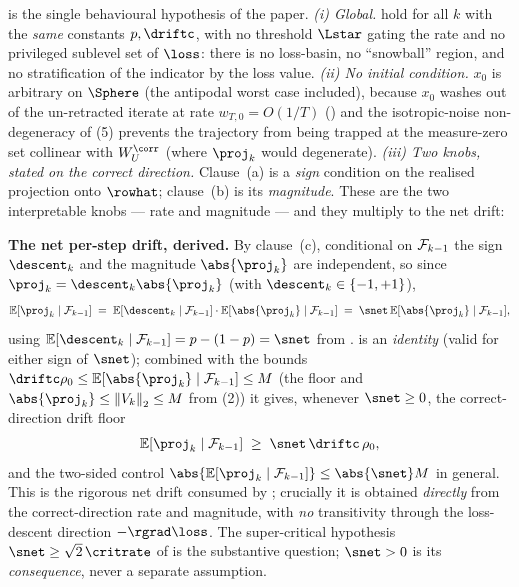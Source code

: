 \begin{remark}
\label{rem:descent_globality}
 is the single behavioural hypothesis of the paper.
\emph{(i) Global.} 
hold for all $k$ with the \emph{same} constants $p,\driftc$, with no
threshold $\Lstar$ gating the rate and no privileged sublevel set of
$\loss$: there is no loss-basin, no ``snowball'' region, and no
stratification of the indicator by the loss value. \emph{(ii) No initial
condition.} $x_0$ is arbitrary on $\Sphere$ (the antipodal worst case
included), because $x_0$ washes out of the un-retracted iterate at rate
$w_{T,0}=O(1/T)$ () and the
isotropic-noise non-degeneracy of (5)
prevents the trajectory from being trapped at the measure-zero set
collinear with $W_U^{\corr}$ (where $\proj_k$ would degenerate). \emph{(iii)
Two knobs, stated on the correct direction.} Clause~(a) is a \emph{sign}
condition on the realised projection onto $\rowhat$; clause~(b) is its
\emph{magnitude}. These are the two interpretable knobs --- rate and
magnitude --- and they multiply to the net drift:

\smallskip\noindent\textbf{The net per-step drift, derived.} By
clause~(c), conditional on $\mathcal{F}_{k-1}$ the sign $\descent_k$ and the
magnitude $\abs{\proj_k}$ are independent, so since
$\proj_k=\descent_k\abs{\proj_k}$ (with $\descent_k\in\{-1,+1\}$),
\begin{align}\label{eq:net_drift}
   \E[\proj_k\mid\Fcal_{k-1}]
   \;=\; \E[\descent_k\mid\Fcal_{k-1}]\cdot\E[\abs{\proj_k}\mid\Fcal_{k-1}]
   \;=\; \snet\,\E[\abs{\proj_k}\mid\Fcal_{k-1}],
\end{align}
using $\E[\descent_k\mid\Fcal_{k-1}]=p-(1-p)=\snet$ from
.  is an \emph{identity}
(valid for either sign of $\snet$); combined with the bounds
$\driftc\rho_0\le\E[\abs{\proj_k}\mid\Fcal_{k-1}]\le M$ (the floor
 and $\abs{\proj_k}\le\norm{V_k}_2\le M$ from
(2)) it gives, whenever $\snet\ge0$, the
correct-direction drift floor
\begin{align}\label{eq:net_drift_floor}
   \E[\proj_k\mid\Fcal_{k-1}] \;\ge\; \snet\,\driftc\,\rho_0,
\end{align}
and the two-sided control $\abs{\E[\proj_k\mid\Fcal_{k-1}]}\le\abs{\snet}M$
in general. This is the rigorous net drift consumed by
; crucially it is obtained \emph{directly} from the
correct-direction rate and magnitude, with \emph{no} transitivity through
the loss-descent direction $-\rgrad\loss$. The super-critical hypothesis
$\snet\ge\sqrt2\,\critrate$ of  is the substantive question;
$\snet>0$ is its \emph{consequence}, never a separate assumption.
\end{remark}

